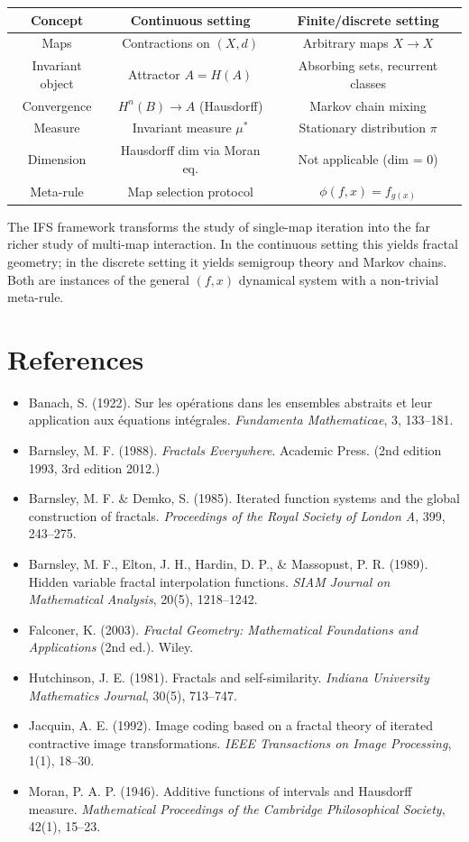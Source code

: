 \begin{center}
\begin{tabular}{ccc}
\toprule
Concept & Continuous setting & Finite/discrete setting \\
\midrule
Maps & Contractions on $(X, d)$ & Arbitrary maps $X \to X$ \\
Invariant object & Attractor $A = H(A)$ & Absorbing sets, recurrent classes \\
Convergence & $H^n(B) \to A$ (Hausdorff) & Markov chain mixing \\
Measure & Invariant measure $\mu^*$ & Stationary distribution $\pi$ \\
Dimension & Hausdorff dim via Moran eq. & Not applicable (dim = 0) \\
Meta-rule & Map selection protocol & $\phi(f, x) = f_{g(x)}$ \\
\bottomrule
\end{tabular}
\end{center}

The IFS framework transforms the study of single-map iteration into the far richer study of multi-map interaction. In the continuous setting this yields fractal geometry; in the discrete setting it yields semigroup theory and Markov chains. Both are instances of the general $(f, x)$ dynamical system with a non-trivial meta-rule.

\section{References}

\begin{itemize}
\item Banach, S. (1922). Sur les opérations dans les ensembles abstraits et leur application aux équations intégrales. \textit{Fundamenta Mathematicae}, 3, 133–181.
\item Barnsley, M. F. (1988). \textit{Fractals Everywhere}. Academic Press. (2nd edition 1993, 3rd edition 2012.)
\item Barnsley, M. F. \& Demko, S. (1985). Iterated function systems and the global construction of fractals. \textit{Proceedings of the Royal Society of London A}, 399, 243–275.
\item Barnsley, M. F., Elton, J. H., Hardin, D. P., \& Massopust, P. R. (1989). Hidden variable fractal interpolation functions. \textit{SIAM Journal on Mathematical Analysis}, 20(5), 1218–1242.
\item Falconer, K. (2003). \textit{Fractal Geometry: Mathematical Foundations and Applications} (2nd ed.). Wiley.
\item Hutchinson, J. E. (1981). Fractals and self-similarity. \textit{Indiana University Mathematics Journal}, 30(5), 713–747.
\item Jacquin, A. E. (1992). Image coding based on a fractal theory of iterated contractive image transformations. \textit{IEEE Transactions on Image Processing}, 1(1), 18–30.
\item Moran, P. A. P. (1946). Additive functions of intervals and Hausdorff measure. \textit{Mathematical Proceedings of the Cambridge Philosophical Society}, 42(1), 15–23.
\end{itemize}




